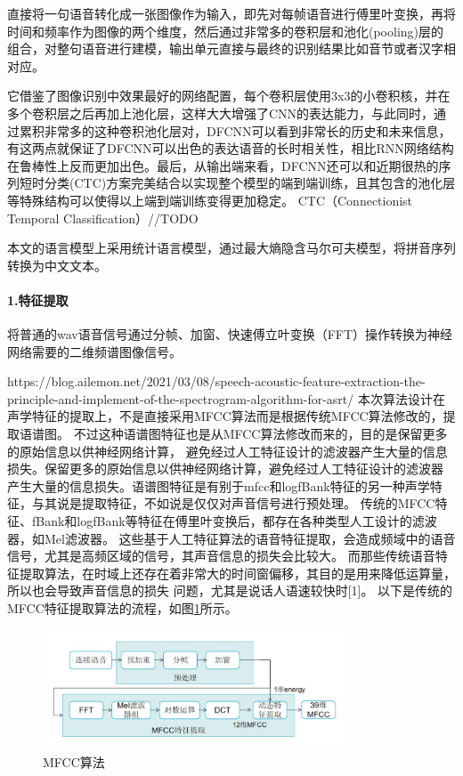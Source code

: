 \documentclass[12pt,a4paper,fancyhdr,openany,oneside]{ctexbook}
\begin{document}
直接将一句语音转化成一张图像作为输入，即先对每帧语音进行傅里叶变换，再将时间和频率作为图像的两个维度，然后通过非常多的卷积层和池化(pooling)层的组合，对整句语音进行建模，输出单元直接与最终的识别结果比如音节或者汉字相对应。

它借鉴了图像识别中效果最好的网络配置，每个卷积层使用3x3的小卷积核，并在多个卷积层之后再加上池化层，这样大大增强了CNN的表达能力，与此同时，通过累积非常多的这种卷积池化层对，DFCNN可以看到非常长的历史和未来信息，有这两点就保证了DFCNN可以出色的表达语音的长时相关性，相比RNN网络结构在鲁棒性上反而更加出色。最后，从输出端来看，DFCNN还可以和近期很热的序列短时分类(CTC)方案完美结合以实现整个模型的端到端训练，且其包含的池化层等特殊结构可以使得以上端到端训练变得更加稳定。
CTC（Connectionist Temporal Classiﬁcation）//TODO


本文的语言模型上采用统计语言模型，通过最大熵隐含马尔可夫模型，将拼音序列转换为中文文本。


\paragraph{1.特征提取} 将普通的wav语音信号通过分帧、加窗、快速傅立叶变换（FFT）操作转换为神经网络需要的二维频谱图像信号。

https://blog.ailemon.net/2021/03/08/speech-acoustic-feature-extraction-the-principle-and-implement-of-the-spectrogram-algorithm-for-asrt/
本次算法设计在声学特征的提取上，不是直接采用MFCC算法而是根据传统MFCC算法修改的，提取语谱图。
不过这种语谱图特征也是从MFCC算法修改而来的，目的是保留更多的原始信息以供神经网络计算，
避免经过人工特征设计的滤波器产生大量的信息损失。保留更多的原始信息以供神经网络计算，避免经过人工特征设计的滤波器
产生大量的信息损失。语谱图特征是有别于mfcc和logfBank特征的另一种声学特征，与其说是提取特征，不如说是仅仅对声音信号进行预处理。
传统的MFCC特征、fBank和logfBank等特征在傅里叶变换后，都存在各种类型人工设计的滤波器，如Mel滤波器。
这些基于人工特征算法的语音特征提取，会造成频域中的语音信号，尤其是高频区域的信号，其声音信息的损失会比较大。
而那些传统语音特征提取算法，在时域上还存在着非常大的时间窗偏移，其目的是用来降低运算量，所以也会导致声音信息的损失
问题，尤其是说话人语速较快时[1]。
以下是传统的MFCC特征提取算法的流程，如图\ref{mfcc.png}所示。
\begin{figure}[htbp]
\centering
    \includegraphics[width=0.8\textwidth]{resource/img/mfcc.png}
    \caption{MFCC算法}
    \label{mfcc.png}
\end{figure}
\end{document}
